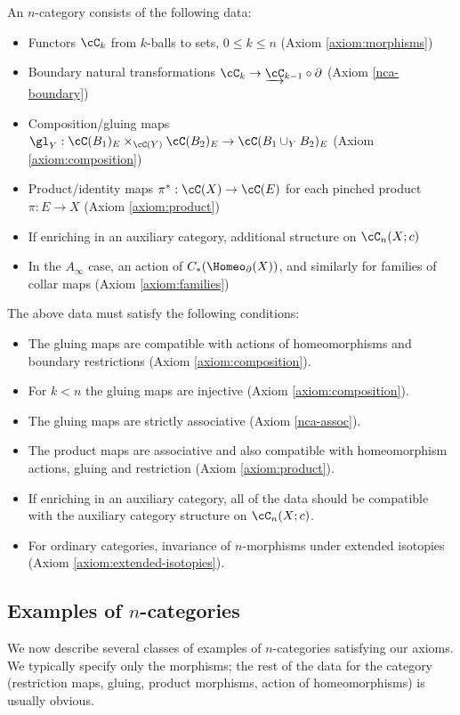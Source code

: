 An $n$-category consists of the following data:
\begin{itemize}
\item Functors $\cC_k$ from $k$-balls to sets, $0\le k\le n$ (Axiom \ref{axiom:morphisms})
\item Boundary natural transformations $\cC_k \to \cl{\cC}_{k-1} \circ \bd$ (Axiom \ref{nca-boundary})
\item Composition/gluing maps $\gl_Y : \cC(B_1)_E \times_{\cC(Y)} \cC(B_2)_E \to \cC(B_1\cup_Y B_2)_E$ (Axiom \ref{axiom:composition})
\item Product/identity maps $\pi^*:\cC(X)\to \cC(E)$ for each pinched product $\pi:E\to X$ (Axiom \ref{axiom:product})
\item If enriching in an auxiliary category, additional structure on $\cC_n(X; c)$
\item In the $A_\infty$ case, an action of $C_*(\Homeo_\bd(X))$, and similarly for families of collar maps (Axiom \ref{axiom:families})
\end{itemize}
The above data must satisfy the following conditions:
\begin{itemize}
\item The gluing maps are compatible with actions of homeomorphisms and boundary 
restrictions (Axiom \ref{axiom:composition}).
\item For $k<n$ the gluing maps are injective (Axiom \ref{axiom:composition}).
\item The gluing maps are strictly associative (Axiom \ref{nca-assoc}).
\item The product maps are associative and also compatible with homeomorphism actions, gluing and restriction (Axiom \ref{axiom:product}).
\item If enriching in an auxiliary category, all of the data should be compatible 
with the auxiliary category structure on $\cC_n(X; c)$.
\item For ordinary categories, invariance of $n$-morphisms under extended isotopies (Axiom \ref{axiom:extended-isotopies}).
\end{itemize}


\subsection{Examples of \texorpdfstring{$n$}{n}-categories}
\label{ss:ncat-examples}


We now describe several classes of examples of $n$-categories satisfying our axioms.
We typically specify only the morphisms; the rest of the data for the category
(restriction maps, gluing, product morphisms, action of homeomorphisms) is usually obvious.

